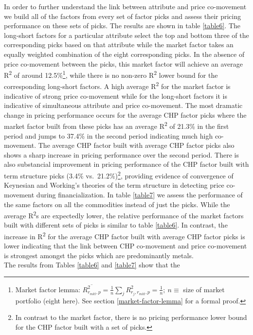 \documentclass[12pt,]{article}
\let\rmarkdownfootnote\footnote%
\def\footnote{\protect\rmarkdownfootnote}
\begin{document}
In order to further understand the link between attribute and price
co-movement we build all of the factors from every set of factor picks
and assess their pricing performance on these sets of picks. The results
are shown in table \ref{table6}. The long-short factors for a particular
attribute select the top and bottom three of the corresponding picks
based on that attribute while the market factor takes an equally
weighted combination of the eight corresponding picks. In the absence of
price co-movement between the picks, this market factor will achieve an
average R\textsuperscript{2} of around 12.5\%\footnote{Market factor
  lemma:
  \(\overline{R_{r_{mkt}, p}^{2}} = \frac{1}{n} \sum_{j} R_{r_{j}, r_{mkt}, p}^{2} = \frac{1}{n}; \: n\equiv\)
  size of market portfolio (eight here). See section
  \ref{market-factor-lemma} for a formal proof.}, while there is no
non-zero R\textsuperscript{2} lower bound for the corresponding
long-short factors. A high average R\textsuperscript{2} for the market
factor is indicative of strong price co-movement while for the
long-short factors it is indicative of simultaneous attribute and price
co-movement. The most dramatic change in pricing performance occurs for
the average CHP factor picks where the market factor built from these
picks has an average R\textsuperscript{2} of 21.3\% in the first period
and jumps to 37.4\% in the second period indicating much high
co-movement. The average CHP factor built with average CHP factor picks
also shows a sharp increase in pricing performance over the second
period. There is also substancial improvement in pricing performance of
the CHP factor built with term structure picks (3.4\%
vs.~21.2\%)\footnote{In contrast to the market factor, there is no
  pricing performance lower bound for the CHP factor built with a set of
  picks.}, providing evidence of convergence of Keynesian and Working's
theories of the term structure in detecting price co-movement during
financialization. In table \ref{table7} we assess the performance of the
same factors on all the commodities instead of just the picks. While the
average R\textsuperscript{2}s are expectedly lower, the relative
performance of the market factors built with different sets of picks is
similar to table \ref{table6}. In contrast, the increase in
R\textsuperscript{2} for the average CHP factor built with average CHP
factor picks is lower indicating that the link between CHP co-movement
and price co-movement is strongest amongst the picks which are
predominantly metals.\\
The results from Tables \ref{table6} and \ref{table7} show that the
\end{document}
